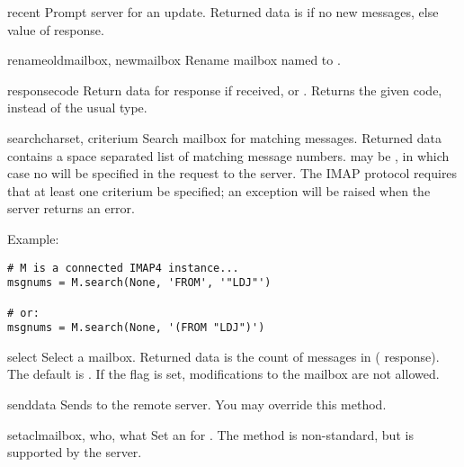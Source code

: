 \begin{methoddesc}{recent}{}
  Prompt server for an update. Returned data is  if no new
  messages, else value of  response.
\end{methoddesc}

\begin{methoddesc}{rename}{oldmailbox, newmailbox}
  Rename mailbox named  to .
\end{methoddesc}

\begin{methoddesc}{response}{code}
  Return data for response  if received, or
  . Returns the given code, instead of the usual type.
\end{methoddesc}

\begin{methoddesc}{search}{charset, criterium}
  Search mailbox for matching messages.  Returned data contains a space
  separated list of matching message numbers.   may be
  , in which case no  will be specified in the
  request to the server.  The IMAP protocol requires that at least one
  criterium be specified; an exception will be raised when the server
  returns an error.

  Example:

\begin{verbatim}
# M is a connected IMAP4 instance...
msgnums = M.search(None, 'FROM', '"LDJ"')

# or:
msgnums = M.search(None, '(FROM "LDJ")')
\end{verbatim}
\end{methoddesc}

\begin{methoddesc}{select}{}
  Select a mailbox. Returned data is the count of messages in
   ( response).  The default 
  is .  If the  flag is set, modifications
  to the mailbox are not allowed.
\end{methoddesc}

\begin{methoddesc}{send}{data}
  Sends  to the remote server.
  You may override this method.
\end{methoddesc}

\begin{methoddesc}{setacl}{mailbox, who, what}
  Set an  for .
  The method is non-standard, but is supported by the  server.
\end{methoddesc}

